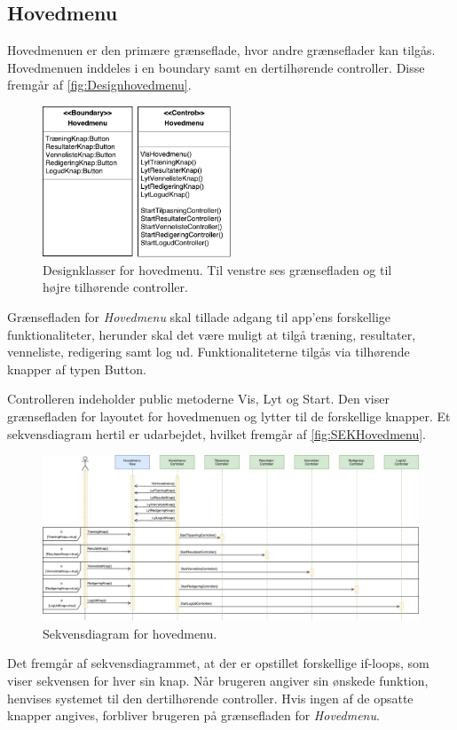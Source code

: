 \subsection*{Hovedmenu} \label{sec:MVCHovedmenu}
Hovedmenuen er den primære grænseflade, hvor andre grænseflader kan tilgås.
Hovedmenuen inddeles i en boundary samt en dertilhørende controller. Disse fremgår af \autoref{fig:Designhovedmenu}.

\begin{figure} [H]
\centering
\includegraphics[width=0.5\textwidth]{figures/MVC/MVCHovedmenu}
\caption{Designklasser for hovedmenu. Til venstre ses grænsefladen og til højre tilhørende controller.}
\label{fig:Designhovedmenu}
\end{figure}

\noindent
Grænsefladen for \textit{Hovedmenu} skal tillade adgang til app'ens forskellige funktionaliteter, herunder skal det være muligt at tilgå træning, resultater, venneliste, redigering samt log ud. Funktionaliteterne tilgås via tilhørende knapper af typen Button. 

Controlleren indeholder public metoderne Vis, Lyt og Start. Den viser grænsefladen for layoutet for hovedmenuen og lytter til de forskellige knapper. Et sekvensdiagram hertil er udarbejdet, hvilket fremgår af \autoref{fig:SEKHovedmenu}. 

\begin{figure} [H]
\centering
\includegraphics[width=1.55\textwidth, angle=90]{figures/Sek/SEKHovedmenu}
\caption{Sekvensdiagram for hovedmenu.}
\label{fig:SEKHovedmenu}
\end{figure}

\noindent
Det fremgår af sekvensdiagrammet, at der er opstillet forskellige if-loops, som viser sekvensen for hver sin knap. Når brugeren angiver sin ønskede funktion, henvises systemet til den dertilhørende controller. Hvis ingen af de opsatte knapper angives, forbliver brugeren på grænsefladen for \textit{Hovedmenu}.